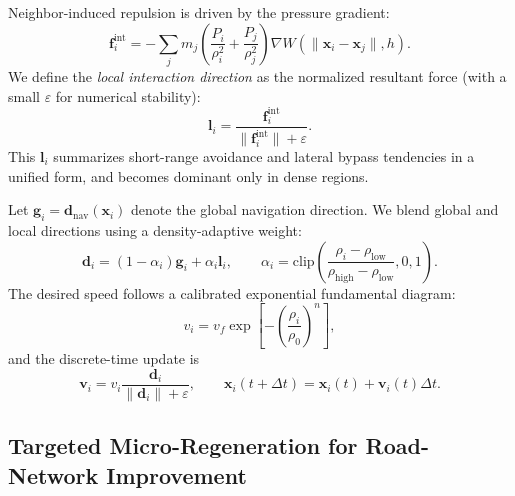 \documentclass[preprint,12pt]{elsarticle}
\begin{document}
Neighbor-induced repulsion is driven by the pressure gradient:
\begin{equation}
\mathbf{f}_i^{\mathrm{int}}
=
- \sum_{j}
m_j
\left(
\frac{P_i}{\rho_i^2}
+
\frac{P_j}{\rho_j^2}
\right)
\nabla W(\|\mathbf{x}_i - \mathbf{x}_j\|, h).
\label{eq:interaction_s}
\end{equation}
We define the \emph{local interaction direction} as the normalized resultant force
(with a small $\varepsilon$ for numerical stability):
\begin{equation}
\mathbf{l}_i = \frac{\mathbf{f}_i^{\mathrm{int}}}{\|\mathbf{f}_i^{\mathrm{int}}\|+\varepsilon}.
\label{eq:local_dir_s}
\end{equation}
This $\mathbf{l}_i$ summarizes short-range avoidance and lateral bypass tendencies in a unified form,
and becomes dominant only in dense regions.

Let $\mathbf{g}_i=\mathbf{d}_{\mathrm{nav}}(\mathbf{x}_i)$ denote the global navigation direction.
We blend global and local directions using a density-adaptive weight:
\begin{equation}
\mathbf{d}_i=(1-\alpha_i)\mathbf{g}_i+\alpha_i\mathbf{l}_i,\qquad
\alpha_i=\mathrm{clip}\!\left(\frac{\rho_i-\rho_{\mathrm{low}}}{\rho_{\mathrm{high}}-\rho_{\mathrm{low}}},0,1\right).
\label{eq:dir-blend_s}
\end{equation}
The desired speed follows a calibrated exponential fundamental diagram:
\begin{equation}
v_i=v_f \exp\!\left[-\left(\frac{\rho_i}{\rho_0}\right)^{n}\right],
\label{eq:speed_underwood_s}
\end{equation}
and the discrete-time update is
\begin{equation}
\mathbf{v}_i=v_i\frac{\mathbf{d}_i}{\|\mathbf{d}_i\|+\varepsilon},\qquad
\mathbf{x}_i(t+\Delta t)=\mathbf{x}_i(t)+\mathbf{v}_i(t)\Delta t.
\label{eq:state-update_s}
\end{equation}


\subsection{Targeted Micro-Regeneration for Road-Network Improvement}
\label{sec:method_micro_regen}
\end{document}
